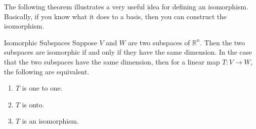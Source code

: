 The following theorem illustrates a very useful idea for defining an
isomorphism. Basically, if you know what it does to a basis, then you can
construct the isomorphism.

\begin{theorem}{Isomorphic Subspaces}\label{thm:isomorphicsubspaces}
Suppose $V$ and $W$ are two subspaces of $\mathbb{R}^n$. Then the two
subspaces are isomorphic if and only if they have the same dimension. In the
case that the two subspaces have the same dimension, then for
 a linear map $T:V\rightarrow W$, the
following are equivalent.

\begin{enumerate}
\item $T$ is one to one.

\item $T$ is onto.

\item $T$ is an isomorphism.
\end{enumerate}
\end{theorem}

